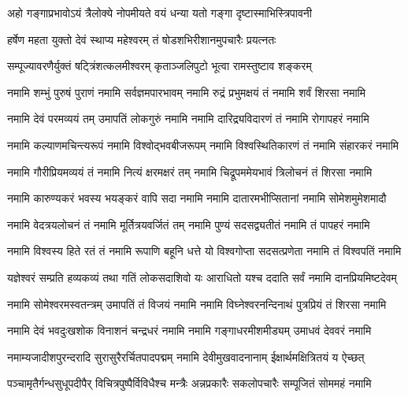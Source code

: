 \twolineshloka
{अहो गङ्गाप्रभावोऽयं त्रैलोक्ये नोपमीयते}
{वयं धन्या यतो गङ्गा दृष्टास्माभिस्त्रिपावनी} %



\twolineshloka
{हर्षेण महता युक्तो देवं स्थाप्य महेश्वरम्}
{तं षोडशभिरीशानमुपचारैः प्रयत्नतः} %

\twolineshloka
{सम्पूज्यावरणैर्युक्तं षट्त्रिंशत्कलमीश्वरम्}
{कृताञ्जलिपुटो भूत्वा रामस्तुष्टाव शङ्करम्} %



\fourlineindentedshloka
{नमामि शम्भुं पुरुषं पुराणं}
{नमामि सर्वज्ञमपारभावम्} 
{नमामि रुद्रं प्रभुमक्षयं तं} 
{नमामि शर्वं शिरसा नमामि}%

\fourlineindentedshloka
{नमामि देवं परमव्ययं तम्} 
{उमापतिं लोकगुरुं नमामि}
{नमामि दारिद्र्यविदारणं तं}
{नमामि रोगापहरं नमामि}%

\fourlineindentedshloka
{नमामि कल्याणमचिन्त्यरूपं}
{नमामि विश्वोद्भवबीजरूपम्}
{नमामि विश्वस्थितिकारणं तं}
{नमामि संहारकरं नमामि}%

\fourlineindentedshloka
{नमामि गौरीप्रियमव्ययं तं}
{नमामि नित्यं क्षरमक्षरं तम्}
{नमामि चिद्रूपममेयभावं}
{त्रिलोचनं तं शिरसा नमामि}%

\fourlineindentedshloka
{नमामि कारुण्यकरं भवस्य}
{भयङ्करं वापि सदा नमामि}
{नमामि दातारमभीप्सितानां}
{नमामि सोमेशमुमेशमादौ}%

\fourlineindentedshloka
{नमामि वेदत्रयलोचनं तं}
{नमामि मूर्तित्रयवर्जितं तम्}
{नमामि पुण्यं सदसद्व्यतीतं}
{नमामि तं पापहरं नमामि}%

\fourlineindentedshloka
{नमामि विश्वस्य हिते रतं तं}
{नमामि रूपाणि बहूनि धत्ते}
{यो विश्वगोप्ता सदसत्प्रणेता}
{नमामि तं विश्वपतिं नमामि}%

\fourlineindentedshloka
{यज्ञेश्वरं सम्प्रति हव्यकव्यं}
{तथा गतिं लोकसदाशिवो यः}
{आराधितो यश्च ददाति सर्वं}
{नमामि दानप्रियमिष्टदेवम्}%

\fourlineindentedshloka
{नमामि सोमेश्वरमस्वतन्त्रम्}
{उमापतिं तं विजयं नमामि}
{नमामि विघ्नेश्वरनन्दिनाथं}
{पुत्रप्रियं तं शिरसा नमामि}%

\fourlineindentedshloka
{नमामि देवं भवदुःखशोक}
{विनाशनं चन्द्रधरं नमामि}
{नमामि गङ्गाधरमीशमीड्यम्}
{उमाधवं देववरं नमामि}%

\fourlineindentedshloka
{नमाम्यजादीशपुरन्दरादि}
{सुरासुरैरर्चितपादपद्मम्}
{नमामि देवीमुखवादनानाम्}
{ईक्षार्थमक्षित्रितयं य ऐच्छत्}%

\fourlineindentedshloka
{पञ्चामृतैर्गन्धसुधूपदीपैर्}
{विचित्रपुष्पैर्विविधैश्च मन्त्रैः}
{अन्नप्रकारैः सकलोपचारैः}
{सम्पूजितं सोममहं नमामि}%

